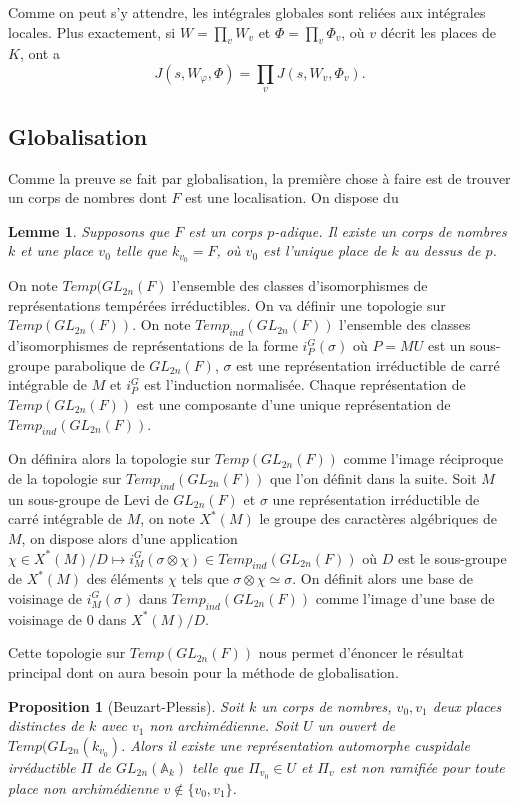 \documentclass{amsart}
\newtheorem{proposition}{Proposition}[section]
\newtheorem{lemme}{Lemme}[section]
\begin{document}
 Comme on peut s'y attendre, les intégrales globales sont reliées aux intégrales locales. Plus exactement, si $W=\prod_v W_v$ et $\Phi = \prod_v \Phi_v$, où $v$ décrit les places de $K$, ont a
 \begin{equation}
 J(s,W_\varphi,\Phi)=\prod_v J(s, W_v, \Phi_v).
 \end{equation}
 
 \subsection{Globalisation}
 
 Comme la preuve se fait par globalisation, la première chose à faire est de trouver un corps de nombres dont $F$ est une localisation. On dispose du
 \begin{lemme}
 \label{corpsglobal}
 Supposons que $F$ est un corps $p$-adique. Il existe un corps de nombres $k$ et une place $v_0$ telle que $k_{v_0} = F$, où $v_0$ est l'unique place de $k$ au dessus de $p$.
 \end{lemme}
 
 On note $Temp(GL_{2n}(F)$ l'ensemble des classes d'isomorphismes de représentations tempérées irréductibles. On va définir une topologie sur $Temp(GL_{2n}(F))$. On note $Temp_{ind}(GL_{2n}(F))$ l'ensemble des classes d'isomorphismes de représentations de la forme $i_P^G(\sigma)$ où $P=MU$ est un sous-groupe parabolique de $GL_{2n}(F)$, $\sigma$ est une représentation irréductible de carré intégrable de $M$ et $i_P^G$ est l'induction normalisée. Chaque représentation de $Temp(GL_{2n}(F))$ est une composante d'une unique représentation de $Temp_{ind}(GL_{2n}(F))$.
 
 On définira alors la topologie sur $Temp(GL_{2n}(F))$ comme l'image réciproque de la topologie sur $Temp_{ind}(GL_{2n}(F))$ que l'on définit dans la suite. Soit $M$ un sous-groupe de Levi de $GL_{2n}(F)$ et $\sigma$ une représentation irréductible de carré intégrable de $M$, on note $X^*(M)$ le groupe des caractères algébriques de $M$, on dispose alors d'une application $\chi \in X^*(M)/D \mapsto i^G_M(\sigma \otimes \chi) \in Temp_{ind}(GL_{2n}(F))$ où $D$ est le sous-groupe de $X^*(M)$ des éléments $\chi$ tels que $\sigma \otimes \chi \simeq \sigma$. On définit alors une base de voisinage de $i^G_M(\sigma)$ dans $Temp_{ind}(GL_{2n}(F))$ comme l'image d'une base de voisinage de $0$ dans $X^*(M)/D$.
 
 Cette topologie sur $Temp(GL_{2n}(F))$ nous permet d'énoncer le résultat principal dont on aura besoin pour la méthode de globalisation.
 \begin{proposition}[Beuzart-Plessis]
 \label{globalisation}
 Soit $k$ un corps de nombres, $v_0,v_1$ deux places distinctes de $k$ avec $v_1$ non archimédienne. Soit $U$ un ouvert de $Temp(GL_{2n}(k_{v_0})$. Alors il existe une représentation automorphe cuspidale irréductible $\Pi$ de $GL_{2n}(\mathbb{A}_k)$ telle que $\Pi_{v_0} \in U$ et $\Pi_v$ est non ramifiée pour toute place non archimédienne $v \not \in \{v_0,v_1\}$.
 \end{proposition}
 
\end{document}
